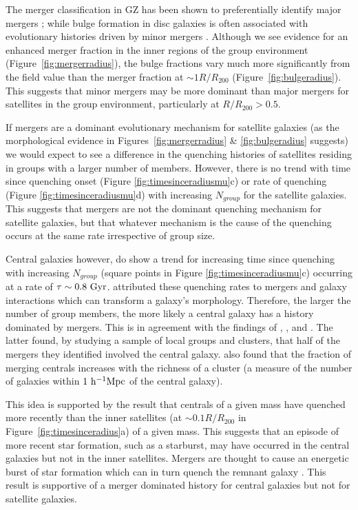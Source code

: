 \documentclass[useAMS,usenatbib]{mn2e}
\begin{document}
The merger classification in GZ has been shown to preferentially identify major mergers \citep{Darg10a, casteels13}; while bulge formation in disc galaxies is often associated with evolutionary histories driven by minor mergers \citep{Croton06, tonini16}.  Although we see evidence for an enhanced merger fraction in the inner regions of the group environment (Figure~\ref{fig:mergerradius}), the bulge fractions vary much more significantly from the field value than the merger fraction at $\sim1R/R_{200}$ (Figure~\ref{fig:bulgeradius}). This suggests that minor mergers may be more dominant than major mergers for satellites in the group environment, particularly at $R/R_{200} > 0.5$. 

If mergers are a dominant evolutionary mechanism for satellite galaxies (as the morphological evidence in Figures~\ref{fig:mergerradius} \& \ref{fig:bulgeradius} suggests) we would expect to see a difference in the quenching histories of satellites residing in groups with a larger number of members. However, there is no trend with time since quenching onset (Figure \ref{fig:timesinceradiusmu}c) or rate of quenching (Figure \ref{fig:timesinceradiusmu}d) with increasing $N_{group}$ for the satellite galaxies. This suggests that mergers are not the dominant quenching mechanism for satellite galaxies, but that whatever mechanism is the cause of the quenching occurs at the same rate irrespective of group size. 

Central galaxies however, do show a trend for increasing time since quenching with increasing $N_{group}$ (square points in Figure \ref{fig:timesinceradiusmu}c) occurring at a rate of $\tau \sim 0.8~\rm{Gyr}$. \cite{smethurst15} attributed these quenching rates to mergers and galaxy interactions which can transform a galaxy's morphology. Therefore, the larger the number of group members, the more likely a central galaxy has a history dominated by mergers. This is in agreement with the findings of \citet{lin10}, \citet{ellison10}, \citet{lidman13} and \citet{mcintosh08}. The latter found, by studying a sample of local groups and clusters, that half of the mergers they identified involved the central galaxy. \cite{liu09} also found that the fraction of merging centrals increases with the richness of a cluster (a measure of the number of galaxies within $1~\rm{h}^{-1}\rm{Mpc}$ of the central galaxy).

This idea is supported by the result that centrals of a given mass have quenched more recently than the inner satellites (at $\sim0.1R/R_{200}$ in Figure~\ref{fig:timesinceradius}a) of a given mass. This suggests that an episode of more recent star formation, such as a starburst, may have occurred in the central galaxies but not in the inner satellites. Mergers are thought to cause an energetic burst of star formation which can in turn quench the remnant galaxy \citep{hopkins05, treister12, pontzen16}. This result is supportive of a merger dominated history for central galaxies but not for satellite galaxies.
\end{document}
